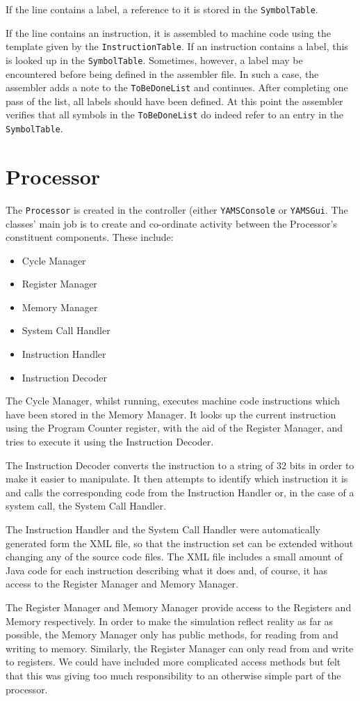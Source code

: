 If the line contains a label, a reference to it is stored in the {\tt SymbolTable}.

If the line contains an instruction, it is assembled to machine code using the template given by the {\tt InstructionTable}. If an instruction contains a label, this is looked up in the {\tt SymbolTable}. Sometimes, however, a label may be encountered before being defined in the assembler file. In such a case, the assembler adds a note to the {\tt ToBeDoneList} and continues. After completing one pass of the list, all labels should have been defined. At this point the assembler verifies that all symbols in the {\tt ToBeDoneList} do indeed refer to an entry in the {\tt SymbolTable}.


\section{Processor}

The {\tt Processor} is created in the controller (either {\tt YAMSConsole} or {\tt YAMSGui}. The classes' main job is to create and co-ordinate activity between the Processor's constituent components. These include: 
\begin{itemize}
\item Cycle Manager
\item Register Manager
\item Memory Manager
\item System Call Handler
\item Instruction Handler
\item Instruction Decoder
\end{itemize}

The Cycle Manager, whilst running, executes machine code instructions which have been stored in the Memory Manager. It looks up the current instruction using the Program Counter register, with the aid of the Register Manager, and tries to execute it using the Instruction Decoder.

The Instruction Decoder converts the instruction to a string of 32 bits in order to make it easier to manipulate. It then attempts to identify which instruction it is and calls the corresponding code from the Instruction Handler or, in the case of a system call, the System Call Handler.

The Instruction Handler and the System Call Handler were automatically generated form the XML file, so that the instruction set can be extended without changing any of the source code files. The XML file includes a small amount of Java code for each instruction describing what it does and, of course, it has access to the Register Manager and Memory Manager.

The Register Manager and Memory Manager provide access to the Registers and Memory respectively. In order to make the simulation reflect reality as far as possible, the Memory Manager only has public methods, for reading from and writing to memory. Similarly, the Register Manager can only read from and write to registers. We could have included more complicated access methods but felt that this was giving too much responsibility to an otherwise simple part of the processor.
